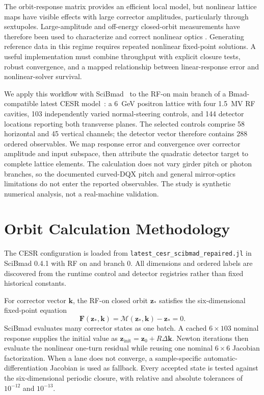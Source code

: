 \documentclass[letterpaper]{jacow}
\begin{document}
The orbit-response matrix provides an efficient local model, but nonlinear
lattice maps have visible effects with large corrector amplitudes, particularly
through sextupoles. Large-amplitude and off-energy closed-orbit measurements have
therefore been used to characterize and correct nonlinear optics
\cite{olsson2020,huang2024}.  Generating reference data in this regime requires
repeated nonlinear fixed-point solutions.  A useful implementation must combine
throughput with explicit closure tests, robust convergence, and a mapped
relationship between linear-response error and nonlinear-solver survival.

We apply this workflow with SciBmad~\cite{scibmad2026} to the RF-on main branch
of a Bmad-compatible latest CESR model~\cite{sagan2006,cesrModel}: a
\qty{6}{\giga\electronvolt} positron lattice with four
\qty{1.5}{\mega\volt} RF cavities, 103 independently varied normal-steering
controls, and 144 detector locations reporting both transverse planes. The
selected controls comprise 58 horizontal and 45 vertical channels; the
detector vector therefore contains 288 ordered observables. We map response
error and convergence over corrector amplitude and input subspace, then
attribute the quadratic detector target to complete lattice elements. The
calculation does not vary girder pitch or photon branches, so the documented
curved-DQX pitch and general mirror-optics limitations do not enter the
reported observables. The study is synthetic numerical analysis, not a
real-machine validation.

\section{Orbit Calculation Methodology}

The CESR configuration is loaded from
\texttt{latest\_cesr\_scibmad\_repaired.jl} in SciBmad 0.4.1 with RF on and
branch 0. All dimensions and ordered labels are discovered from the runtime
control and detector registries rather than fixed historical constants.

For corrector vector $\bm k$, the RF-on closed orbit $\bm z_*$ satisfies the
six-dimensional fixed-point equation
\begin{equation}
  \bm F(\bm z_*,\bm k)=\mathcal M(\bm z_*,\bm k)-\bm z_*=0 .
  \label{eq:fixedpoint}
\end{equation}
SciBmad evaluates many corrector states as one batch.  A cached
$6\times103$ nominal response supplies the initial value as
$\bm z_{\mathrm{init}}=\bm z_0+R\Delta\bm k$.  Newton iterations then evaluate the nonlinear one-turn residual while reusing one nominal $6\times6$
Jacobian factorization. When a lane does not converge, a sample-specific
automatic-differentiation Jacobian is used as fallback. Every accepted state
is tested against the six-dimensional periodic closure, with relative and
absolute tolerances of $10^{-12}$ and $10^{-13}$.
\end{document}
